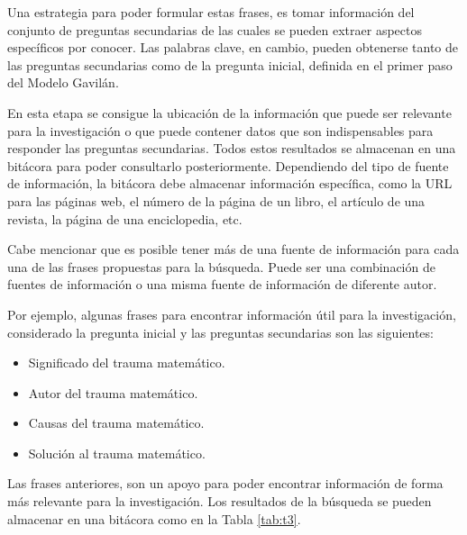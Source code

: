 Una estrategia para poder formular estas frases, es tomar información del conjunto de preguntas secundarias de las cuales se pueden extraer aspectos específicos por conocer. Las palabras clave, en cambio, pueden obtenerse tanto de las preguntas secundarias como de la pregunta inicial, definida en el primer paso del Modelo Gavilán.

En esta etapa se consigue la ubicación de la información que puede ser relevante para la investigación o que puede contener datos que son indispensables para responder las preguntas secundarias. Todos estos resultados se almacenan en una bitácora para poder consultarlo posteriormente. Dependiendo del tipo de fuente de información, la bitácora debe almacenar información específica, como la URL para las páginas web, el número de la página de un libro, el artículo de una revista, la página de una enciclopedia, etc.

Cabe mencionar que es posible tener más de una fuente de información para cada una de las frases propuestas para la búsqueda. Puede ser una combinación de fuentes de información o una misma fuente de información de diferente autor.

Por ejemplo, algunas frases para encontrar información útil para la investigación, considerado la pregunta inicial y las preguntas secundarias son las siguientes:

\begin{itemize}
  \item Significado del trauma matemático.
  \item Autor del trauma matemático.
  \item Causas del trauma matemático.
  \item Solución al trauma matemático.
\end{itemize}

Las frases anteriores, son un apoyo para poder encontrar información de forma más relevante para la investigación. Los resultados de la búsqueda se pueden almacenar en una bitácora como en la Tabla \ref{tab:t3}.

